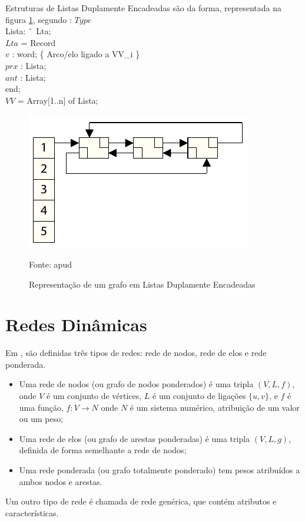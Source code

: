 Estruturas de Listas Duplamente Encadeadas são da forma, representada na figura \ref{fig:listdupla}, segundo \cite{negreirosbook}:
\FloatBarrier
\noindent $Type$\\
Lista: $\string^$ Lta;\\
$Lta$ = Record\\
$v$ : word; \{ Arco/elo ligado a VV\_i \}\\
$prx$ : Lista;\\
$ant$ : Lista;\\
end;\\
$VV$ = Array[1..n] of Lista;\\

\begin{figure}[htbp]
\centering
 \includegraphics[width=.45\textwidth]{figuras/listdupla.png}
\caption{Representação de um grafo em Listas Duplamente Encadeadas}
Fonte: \cite{dynagraph} apud \cite{negreirosbook}
\label{fig:listdupla}
\end{figure}

\FloatBarrier

\section{Redes Dinâmicas}

Em \cite{harary}, são definidas três tipos de redes: rede de nodos, rede de elos e rede ponderada.
\begin{itemize}
\item Uma rede de nodos (ou grafo de nodos ponderados) é uma tripla $(V, L, f)$, onde $V$ é um conjunto
de vértices, $L$ é um conjunto de ligações $\{u,v\}$, e $f$ é uma função, $f: V \rightarrow N$ onde $N$
é um sistema numérico, atribuição de um valor ou um peso;
\item Uma rede de elos (ou grafo de arestas ponderadas) é uma tripla $(V, L, g)$, definida de forma semelhante a rede de nodos;
\item Uma rede ponderada (ou grafo totalmente ponderado) tem pesos atribuídos a ambos nodos e arestas.
\end{itemize}

Um outro tipo de rede é chamada de rede genérica, que contém atributos e características.

